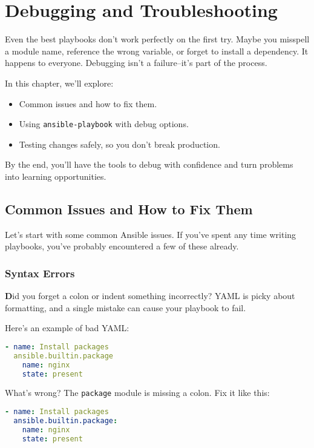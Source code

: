 \chapter{Debugging and Troubleshooting}

Even the best playbooks don't work perfectly on the first try. Maybe you misspell a module name, reference the wrong variable, or forget to install a dependency. It happens to everyone. Debugging isn't a failure--it's part of the process.

In this chapter, we'll explore:
\begin{itemize}
    \item Common issues and how to fix them.
    \item Using \texttt{ansible-playbook} with debug options.
    \item Testing changes safely, so you don't break production.
\end{itemize}

By the end, you'll have the tools to debug with confidence and turn problems into learning opportunities.


\section{Common Issues and How to Fix Them}

Let's start with some common Ansible issues. If you've spent any time writing playbooks, you've probably encountered a few of these already.

\subsection{Syntax Errors}

\textbf{D}id you forget a colon or indent something incorrectly? YAML is picky about formatting, and a single mistake can cause your playbook to fail.

Here's an example of bad YAML:
\begin{lstlisting}[language=yaml, caption=Bad YAML]
- name: Install packages
  ansible.builtin.package
    name: nginx
    state: present
\end{lstlisting}

What's wrong? The \texttt{package} module is missing a colon. Fix it like this:
\begin{lstlisting}[language=yaml, caption=Correct YAML]
- name: Install packages
  ansible.builtin.package:
    name: nginx
    state: present
\end{lstlisting}


